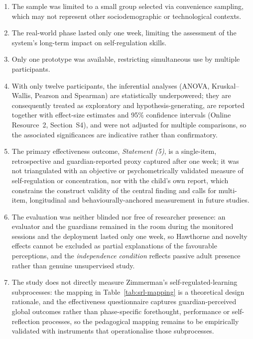 \begin{enumerate}
	\item The sample was limited to a small group selected via convenience sampling, which may not represent other sociodemographic or technological contexts.
	
	\item The real-world phase lasted only one week, limiting the assessment of the system’s long-term impact on self-regulation skills.
	
	\item Only one prototype was available, restricting simultaneous use by multiple participants.
	
	\item With only twelve participants, the inferential analyses (ANOVA, Kruskal--Wallis, Pearson and Spearman) are statistically underpowered; they are consequently treated as exploratory and hypothesis-generating, are reported together with effect-size estimates and 95\% confidence intervals (Online Resource~2, Section~S4), and were not adjusted for multiple comparisons, so the associated significances are indicative rather than confirmatory.
	
	\item The primary effectiveness outcome, \textit{Statement (5)}, is a single-item, retrospective and guardian-reported proxy captured after one week; it was not triangulated with an objective or psychometrically validated measure of self-regulation or concentration, nor with the child's own report, which constrains the construct validity of the central finding and calls for multi-item, longitudinal and behaviourally-anchored measurement in future studies.
	
	\item The evaluation was neither blinded nor free of researcher presence: an evaluator and the guardians remained in the room during the monitored sessions and the deployment lasted only one week, so Hawthorne and novelty effects cannot be excluded as partial explanations of the favourable perceptions, and the \textit{independence condition} reflects passive adult presence rather than genuine unsupervised study.
	
	\item The study does not directly measure Zimmerman's self-regulated-learning subprocesses: the mapping in Table~\ref{tab:srl-mapping} is a theoretical design rationale, and the effectiveness questionnaire captures guardian-perceived global outcomes rather than phase-specific forethought, performance or self-reflection processes, so the pedagogical mapping remains to be empirically validated with instruments that operationalise those subprocesses.
\end{enumerate}

